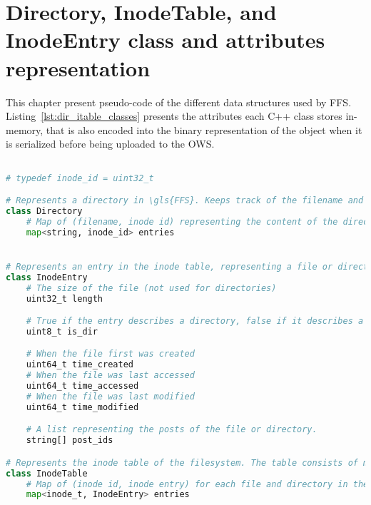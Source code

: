 \chapter{Directory, InodeTable, and\\InodeEntry class and attributes\\representation}
This chapter present \mbox{pseudo-code} of the different data structures used by \gls{FFS}. Listing~\ref{lst:dir_itable_classes} presents the attributes each C++ class stores \mbox{in-memory}, that is also encoded into the binary representation of the object when it is serialized before being uploaded to the \gls{OWS}.

\label{app:inode_dir_code}
\begin{lstlisting}[language=python, caption={The attributes classes representing directories and the inode table in \gls{FFS}}, label=lst:dir_itable_classes,breaklines=true]

# typedef inode_id = uint32_t

# Represents a directory in \gls{FFS}. Keeps track of the filename and inode of each file
class Directory
	# Map of (filename, inode id) representing the content of the directory
	map<string, inode_id> entries


# Represents an entry in the inode table, representing a file or directory
class InodeEntry
	# The size of the file (not used for directories) 
	uint32_t length

	# True if the entry describes a directory, false if it describes a file
	uint8_t is_dir

	# When the file first was created
	uint64_t time_created
	# When the file was last accessed
	uint64_t time_accessed
	# When the file was last modified
	uint64_t time_modified

	# A list representing the posts of the file or directory. 
	string[] post_ids

# Represents the inode table of the filesystem. The table consists of multiple inode entries
class InodeTable
	# Map of (inode id, inode entry) for each file and directory in the filesystem
	map<inode_t, InodeEntry> entries

\end{lstlisting}